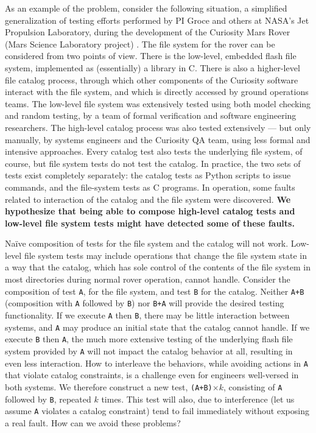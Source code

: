 As an example of the problem, consider the following situation, a
simplified generalization of testing efforts performed by PI Groce and
others at NASA's Jet Propulsion Laboratory, during the development of
the Curiosity Mars Rover (Mars Science Laboratory project)
\cite{CFV08,ICSEDiff,AMAI}.  The file system for the rover can be
considered from two points of view.  There is the low-level, embedded
flash file system, implemented as (essentially) a library in C.  There
is also a higher-level file catalog process, through which other
components of the Curiosity software interact with the file system,
and which is directly accessed by ground operations teams.  The
low-level file system was extensively tested using both model checking
and random testing, by a team of formal verification and software
engineering researchers.  The high-level catalog process was also
tested extensively --- but only manually, by systems engineers and the
Curiosity QA team, using less formal and intensive approaches.  Every
catalog test also tests the underlying file system, of course, but
file system tests do not test the catalog.  In practice, the two sets
of tests exist completely separately: the catalog tests as Python
scripts to issue commands, and the file-system tests as C programs.
In operation, some faults related to interaction of the catalog and
the file system were discovered.  \textbf{We hypothesize that being able to
compose high-level catalog tests and low-level file system tests might
have detected some of these faults.}

Na\"ive composition of tests for the file
system and the catalog will not work.  Low-level file system tests may
include operations that change the file system state in a way that the
catalog, which has sole control of the contents of the file system in
most directories during normal rover operation, cannot handle.
Consider the composition of test {\tt A}, for the file system, and
test {\tt B} for the catalog.  Neither {\tt A+B} (composition with
{\tt A} followed by {\tt B}) nor {\tt B+A} will provide the desired
testing functionality.  If we execute {\tt A} then {\tt B}, there may be little
interaction between systems, and {\tt A} may produce an initial state
that the catalog cannot handle.  If we execute {\tt B} then {\tt A},
the much more extensive testing of the underlying flash file system
provided by {\tt A} will not impact the catalog behavior at all, resulting
in even less interaction.  How to interleave the behaviors, while
avoiding actions in {\tt A} that violate catalog constraints, is a challenge
even for engineers well-versed in both systems.  We therefore
construct a new test, {\tt (A+B)}$\times k$, consisting of {\tt A}
followed by {\tt B}, repeated $k$ times.  This test will also, due to
interference (let us assume {\tt A} violates a catalog constraint) tend to
fail immediately without exposing a real fault. How can we avoid these problems?


